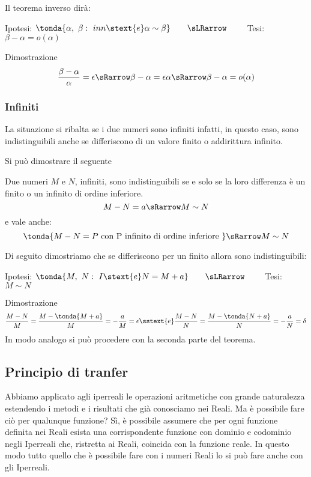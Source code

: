 
Il teorema inverso dirà:
\begin{center}
Ipotesi: \(\tonda{\alpha,~\beta:\ inn \stext{e} \alpha \sim \beta}
\qquad \sLRarrow \qquad\) 
Tesi: \(\beta-\alpha = o(\alpha)\)
\end{center}
Dimostrazione
\[\frac{\beta - \alpha}{\alpha} = \epsilon \sRarrow 
\beta - \alpha =\epsilon \alpha \sRarrow 
\beta - \alpha = o(\alpha)
\]

\subsubsection{Infiniti}
\label{subsubsec:insnum_infiniti}

La situazione si ribalta se i due numeri sono infiniti infatti, in 
questo caso, sono indistinguibili anche se differiscono di 
un valore finito o addirittura infinito. 

Si può dimostrare il seguente
\begin{teorema}
Due numeri \(M\) e \(N\), infiniti, 
sono indistinguibili se e solo se la loro differenza è un finito o 
un infinito di ordine inferiore.
\[M-N = a \sRarrow M \sim N\] 
e vale anche:
\[\tonda{M-N = P \text{ con P infinito di ordine inferiore }} 
\sRarrow M \sim N\] 
\end{teorema}
Di seguito dimostriamo che se differiscono per un finito allora 
sono indistinguibili:
\begin{center}
Ipotesi: \(\tonda{M,~N:\ I \stext{e} N = M+a}
\qquad \sLRarrow\qquad\) 
Tesi: \(M \sim N\)
\end{center}
Dimostrazione
\[\frac{M-N}{M}=
\frac{M-\tonda{M +a}}{M} = 
-\frac{a}{M}= \epsilon \sstext{e} 
\frac{M-N}{N}=
\frac{M-\tonda{N +a}}{N} = 
-\frac{a}{N}= \delta
\]
In modo analogo si può procedere con la seconda parte del teorema.

\subsection{Principio di tranfer}
\label{subsec:insnum_nonarchimedei}

Abbiamo applicato agli iperreali le operazioni aritmetiche con grande 
naturalezza estendendo i metodi e i risultati che già conosciamo nei Reali. 
Ma è possibile fare ciò per qualunque funzione? 
Sì, è possibile assumere che per ogni funzione definita nei Reali esista 
una corrispondente funzione con dominio e codominio negli Iperreali che, 
ristretta ai Reali, coincida con la funzione reale.
In questo modo tutto quello che è possibile fare con i numeri Reali lo si 
può fare anche con gli Iperreali.

